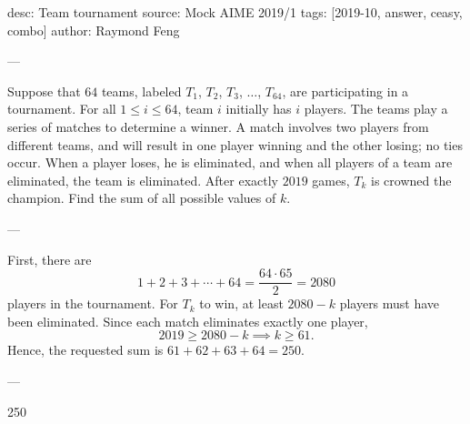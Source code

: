 desc: Team tournament
source: Mock AIME 2019/1
tags: [2019-10, answer, ceasy, combo]
author: Raymond Feng

---

Suppose that $64$ teams, labeled $T_1$, $T_2$, $T_3$, $\ldots$, $T_{64}$, are participating in a tournament. For all $1\le i\le 64$, team $i$ initially has $i$ players. The teams play a series of matches to determine a winner. A match involves two players from different teams, and will result in one player winning and the other losing; no ties occur. When a player loses, he is eliminated, and when all players of a team are eliminated, the team is eliminated. After exactly $2019$ games, $T_k$ is crowned the champion. Find the sum of all possible values of $k$.

---

First, there are \[1+2+3+\cdots+64=\frac{64\cdot 65}2=2080\]
players in the tournament. For $T_k$ to win, at least $2080-k$ players must have been eliminated. Since each match eliminates exactly one player, \[2019\ge 2080-k\implies k\ge 61.\]
Hence, the requested sum is $61+62+63+64=250$.

---

250
